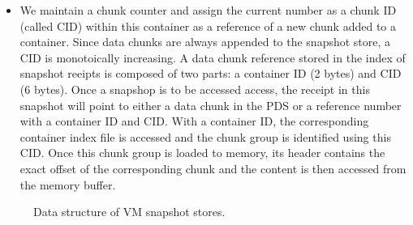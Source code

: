 \begin{itemize}
\begin{itemize}
\item We maintain  a chunk counter and assign the current number 
as a chunk ID (called CID) within this container as a reference of a new chunk added to a container. 
Since data chunks are always appended to the snapshot store, 
 a CID is monotoically increasing.
A data chunk reference stored in the index of snapshot reeipts
is composed of two parts: a container ID (2 bytes) and CID (6 bytes).
Once a snapshop is to be accessed access, the receipt in this snapshot will point to either a data chunk
in the PDS or a reference number with a container ID and CID.
With a container ID, the corresponding container index file is accessed and 
the chunk group is identified using this CID. Once this chunk group is loaded to memory, its header contains the exact offset of the corresponding chunk and the content is then accessed from the memory buffer.

	\end{itemize}
\end{itemize}


 


\begin{figure}[htbp]
  \centering
  \caption{Data structure of VM snapshot stores.}
  \label{fig:as_arch}
\end{figure}

